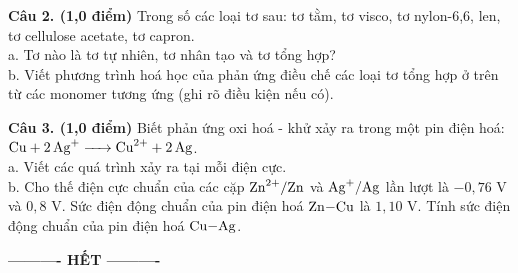 \documentclass[11pt,a4paper]{article}
\begin{document}
\vspace{2pt}

\vspace{4pt}
\noindent
\textbf{Câu 2. (1,0 điểm)} Trong số các loại tơ sau: tơ tằm, tơ visco, tơ nylon-6,6, len, tơ cellulose acetate, tơ capron.\\
a. Tơ nào là tơ tự nhiên, tơ nhân tạo và tơ tổng hợp?\\
b. Viết phương trình hoá học của phản ứng điều chế các loại tơ tổng hợp ở trên từ các monomer tương ứng (ghi rõ điều kiện nếu có).

\vspace{2pt}

\vspace{4pt}
\noindent
\textbf{Câu 3. (1,0 điểm)} Biết phản ứng oxi hoá - khử xảy ra trong một pin điện hoá: $\ce{Cu + 2Ag+ -> Cu^2+ + 2Ag}$.\\
a. Viết các quá trình xảy ra tại mỗi điện cực.\\
b. Cho thế điện cực chuẩn của các cặp $\ce{Zn^2+/Zn}$ và $\ce{Ag+/Ag}$ lần lượt là $-0,76\text{ V}$ và $0,8\text{ V}$. Sức điện động chuẩn của pin điện hoá $\ce{Zn-Cu}$ là $1,10\text{ V}$. Tính sức điện động chuẩn của pin điện hoá $\ce{Cu-Ag}$.

\vspace{2pt}

\vspace{8pt}
\begin{center}
\textbf{---------- HẾT ----------}
\end{center}
\end{document}
